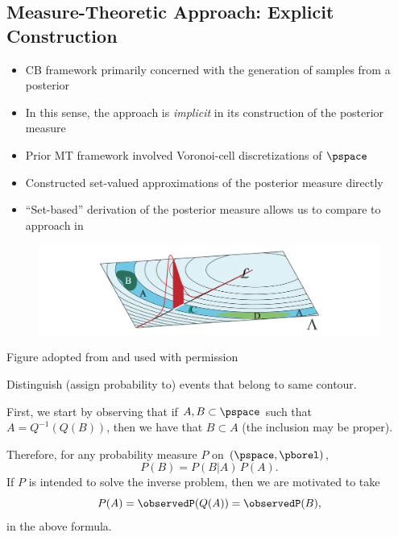 \subsection{Measure-Theoretic Approach: Explicit Construction}
\begin{frame}[t]
\begin{itemize}[<-+->]
	\item <1-> CB framework primarily concerned with the generation of samples from a posterior
	\item <1-> In this sense, the approach is \emph{implicit} in its construction of the posterior measure
	\item <2-> Prior MT framework involved Voronoi-cell discretizations of $\pspace$
	\item <2-> Constructed set-valued approximations of the posterior measure directly
	\item <3> ``Set-based'' derivation of the posterior measure allows us to compare to approach in ~\cite{BET+14}
\end{itemize}

\end{frame}

\begin{frame}[t]

\begin{figure}
\centering
	\includegraphics[width=1\textwidth]{images/troy_mt3contour}
\end{figure}
\begin{center}

{\scriptsize Figure adopted from \cite{BET+14-arxiv} and used with permission}

 Distinguish (assign probability to) events that belong to same contour. 
\end{center}
\end{frame}

\begin{frame}[t]
First, we start by observing that if $A, B \subset \pspace$ such that $A = Q^{-1}(Q(B))$, then we have that $B\subset A$ (the inclusion may be proper).

Therefore, for any probability measure $P$ on $(\pspace, \pborel)$, 
\[
P(B) = P(B|A) \, P(A).
\]
If $P$ is intended to solve the inverse problem, then we are motivated to take
\[
P(A) = \observedP (Q(A)) = \observedP (B),
\]
in the above formula.
\end{frame}

